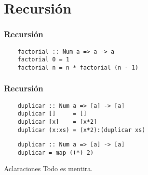 \section{Recursión}
\begin{frame}[fragile]
  \frametitle{Recursión}
  \begin{verbatim}
    factorial :: Num a => a -> a
    factorial 0 = 1
    factorial n = n * factorial (n - 1)
  \end{verbatim}
\end{frame}

\begin{frame}[fragile]
  \frametitle{Recursión}
  \begin{verbatim}
    duplicar :: Num a => [a] -> [a]
    duplicar []     = []
    duplicar [x]    = [x*2]
    duplicar (x:xs) = (x*2):(duplicar xs)
  \end{verbatim}
  \begin{verbatim}
    duplicar :: Num a => [a] -> [a]
    duplicar = map ((*) 2)
  \end{verbatim}
\end{frame}

\begin{frame}{Aclaraciones}
  Todo es mentira.
\end{frame}